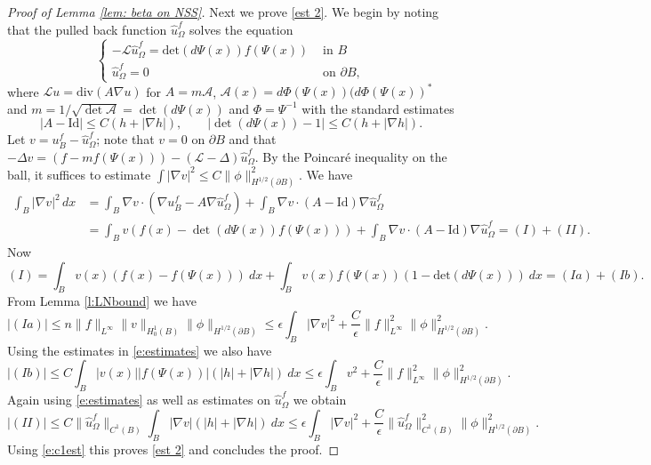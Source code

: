 \documentclass[10pt, reqno]{amsart}
\numberwithin{equation}{section}
\def\W{\Omega}
\begin{document}
\begin{proof}[Proof of Lemma \ref{lem: beta on NSS}]
	
	Next we prove \eqref{est 2}. We begin by noting that the pulled back function $\hat{u}^f_\W$ solves the equation
	\[
	\begin{cases}
		-\mathcal{L} \hat{u}^f_\W = \text{det} (d\Psi(x))f(\Psi(x))  & \text{ in } B\\
		\hat{u}^f_\W =0 & \text{ on } \partial B, 
	\end{cases}
	\]
	where $\mathcal{L}u = \text{div}(A \nabla u)$ for $A = m\mathcal{A}$, $\mathcal{A}(x) = d\Phi(\Psi (x) ) (d\Phi (\Psi(x))^*$ and $m = 1/\sqrt{\det \mathcal A}=\det(d \Psi(x))$ and $\Phi = \Psi^{-1}$ with the standard estimates 
	\begin{equation} \label{e:estimates}
	|A -\text{Id}| \leq C(h +|\nabla h|) , \qquad |\det(d\Psi(x))-1| \leq C(h+ |\nabla h|). 
	\end{equation}
	Let $v = u^f_B - \hat{u}^f_\W$; note that $v=0$ on $\partial B$ and that $-\Delta v = (f-mf(\Psi(x))) - (\mathcal{L}-\Delta)\hat{u}^f_\W. $ By the Poincar\'{e} inequality on the ball, it suffices to estimate $\int |\nabla v|^2 \leq C \| \phi \|_{H^{1/2}(\partial B)}^2.$ We have
	\begin{align*}
		 \int_B |\nabla v|^2\,dx& = \int_B \nabla v \cdot ( \nabla u^f_B - A\nabla \hat{u}^f_\W ) + \int_B \nabla v \cdot (A- \text{Id} ) \nabla \hat{u}^f_\W \\ 
   &=\int_B v \left( f(x)-\det(d \Psi(x))f(\Psi(x))\right) + \int_B \nabla v \cdot (A- \text{Id} ) \nabla \hat{u}^f_\W = (I) + (II). 
	\end{align*}
 Now 
 \[
 (I) = \int_{B} v(x) (f(x)-f(\Psi(x))) \ dx + \int_{B}v(x)f(\Psi(x))(1-\text{det} (d \Psi(x)))\ dx= (Ia)+ (Ib). 
 \]
 From Lemma \ref{l:LNbound} we have 
 \[
 |(Ia)|\leq n \| f \|_{L^{\infty}} \| v \|_{H_0^1(B)} \| \phi \|_{H^{1/2}(\partial B)}
 \leq \epsilon \int_{B} |\nabla v|^2 + \frac{C}{\epsilon} \| f \|^2_{L^{\infty}} \| \phi \|^2_{H^{1/2}(\partial B)}. 
 \]
 Using the estimates in \eqref{e:estimates} we also have 
 \[
 |(Ib)| \leq C \int_{B} |v(x)| |f(\Psi(x))| (|h| + |\nabla h|) \ dx 
 \leq \epsilon \int_{B} v^2 + \frac{C}{\epsilon} \| f \|^2_{L^{\infty}} \| \phi \|^2_{H^{1/2}(\partial B)}. 
 \]
 Again using \eqref{e:estimates} as well as estimates on $\hat{u}^f_{\Omega}$ we obtain 
 \[
 |(II)| \leq C \| \hat{u}^f_{\Omega} \|_{C^1(B)} \int_{B} |\nabla v| (|h|+ |\nabla h|) \ dx 
 \leq \epsilon \int_{B} |\nabla v|^2 + \frac{C}{\epsilon}  \| \hat{u}^f_{\Omega} \|^2_{C^1(B)} \| \phi \|^2_{H^{1/2}(\partial B)}. 
 \]
 Using \eqref{e:c1est} this proves \eqref{est 2} and concludes the proof. 
 \end{proof}
\end{document}
